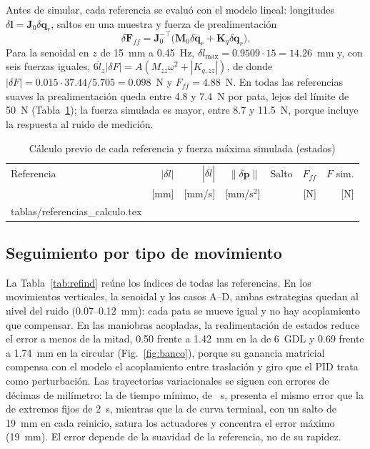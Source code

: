 \documentclass[conference]{IEEEtran}
\makeatletter
\newcommand{\vect}[1]{\bm{#1}}
\newcommand{\tabinput}[1]{\@@input #1 }
\makeatother
\begin{document}
Antes de simular, cada referencia se evaluó con el modelo lineal: longitudes $\delta\vect l = \vect J_0\delta\vect q_r$, saltos en una muestra y fuerza de prealimentación
\begin{equation}
\delta\vect F_{ff} = \vect J_0^{-\top}\bigl(\vect M_0\delta\ddot{\vect q}_r + \vect K_q\delta\vect q_r\bigr).
\label{eq:ff}
\end{equation}
Para la senoidal en $z$ de 15~mm a 0.45~Hz, $\delta l_{\max} = 0.9509\cdot15 = 14.26$~mm y, con seis fuerzas iguales, $6\hat l_z|\delta F| = A(M_{zz}\omega^2 + |K_{q,zz}|)$, de donde $|\delta F| = 0.015\cdot37.44/5.705 = 0.098$~N y $F_{ff} = 4.88$~N. En todas las referencias suaves la prealimentación queda entre 4.8 y 7.4~N por pata, lejos del límite de 50~N (Tabla~\ref{tab:refcalc}); la fuerza simulada es mayor, entre 8.7 y 11.5~N, porque incluye la respuesta al ruido de medición.

\begin{table}[t]
\centering
\caption{Cálculo previo de cada referencia y fuerza máxima simulada (estados)}
\label{tab:refcalc}
\scriptsize
\setlength{\tabcolsep}{2pt}
\begin{tabular}{@{}lrrrlrr@{}}
\toprule
Referencia & $|\delta l|$ & $|\delta\dot l|$ & $\|\delta\ddot{\vect p}\|$ & Salto & $F_{ff}$ & $F$ sim. \\
 & [mm] & [mm/s] & [mm/s$^2$] & & [N] & [N] \\
\midrule
\tabinput{tablas/referencias_calculo.tex}
\bottomrule
\end{tabular}
\end{table}

\subsection{Seguimiento por tipo de movimiento}

La Tabla~\ref{tab:refind} reúne los índices de todas las referencias. En los movimientos verticales, la senoidal y los casos A--D, ambas estrategias quedan al nivel del ruido (0.07--0.12~mm): cada pata se mueve igual y no hay acoplamiento que compensar. En las maniobras acopladas, la realimentación de estados reduce el error a menos de la mitad, 0.50 frente a 1.42~mm en la de 6~GDL y 0.69 frente a 1.74~mm en la circular (Fig.~\ref{fig:banco}), porque su ganancia matricial compensa con el modelo el acoplamiento entre traslación y giro que el PID trata como perturbación. Las trayectorias variacionales se siguen con errores de décimas de milímetro: la de tiempo mínimo, de \TMin~s, presenta el mismo error que la de extremos fijos de 2~s, mientras que la de curva terminal, con un salto de 19~mm en cada reinicio, satura los actuadores y concentra el error máximo (19~mm). El error depende de la suavidad de la referencia, no de su rapidez.
\end{document}
